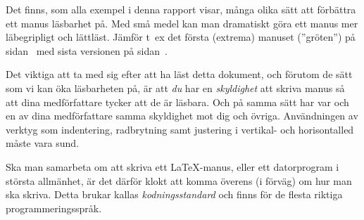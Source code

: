 \documentclass[a4paper,12pt]{article}
\begin{document}
Det finns, som alla exempel i denna rapport visar, många olika sätt att förbättra
ett manus läsbarhet på. Med små medel kan man dramatiskt göra ett
manus mer läbegripligt och lättläst. Jämför t~ex det första (extrema)
manuset (''gröten'') på sidan~\pageref{page:v1} med sista versionen på
sidan~\pageref{page:vn}. 


Det viktiga att ta med sig efter att ha läst detta dokument, och
förutom de sätt som vi kan öka läsbarheten på, är att \emph{du} har en
\emph{skyldighet} att skriva manus så att dina medförfattare tycker att de är
läsbara. Och på samma sätt har var och en av dina medförfattare samma
skyldighet mot dig och övriga. Användningen av verktyg som indentering,
radbrytning samt justering i vertikal- och horisontalled måste vara
sund.  


Ska man samarbeta om att skriva ett \LaTeX-manus, eller ett
datorprogram i största allmänhet, är det därför klokt att komma överens (i
förväg) om hur man ska skriva. Detta brukar kallas
\emph{kodningsstandard} och finns för de flesta riktiga
programmeringsspråk. 
%
\end{document}
